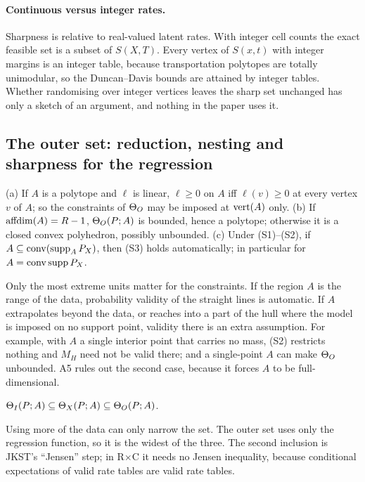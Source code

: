 \paragraph{Continuous versus integer rates.} Sharpness is relative to real-valued
latent rates. With integer cell counts the exact feasible set is a subset of
$S(X,T)$. Every vertex of $S(x,t)$ with integer margins is an integer table,
because transportation polytopes are totally unimodular, so the Duncan--Davis
bounds are attained by integer tables. Whether randomising over integer vertices
leaves the sharp set unchanged has only a sketch of an argument, and nothing in
the paper uses it.

\subsection{The outer set: reduction, nesting and sharpness for the regression}

\begin{lemma}\label{lem:outer}
(a) If $A$ is a polytope and $\ell$ is linear, $\ell\ge0$ on $A$ iff $\ell(v)\ge0$
at every vertex $v$ of $A$; so the constraints of $\Theta_O$ may be imposed at
$\operatorname{vert}(A)$ only. (b) If $\operatorname{affdim}(A)=R-1$, $\Theta_O(P;A)$ is bounded, hence a
polytope; otherwise it is a closed convex polyhedron, possibly unbounded.
(c) Under (S1)--(S2), if $A\subseteq\operatorname{conv}(\operatorname{supp}_AP_X)$, then (S3) holds
automatically; in particular for $A=\operatorname{conv}\operatorname{supp} P_X$.
\end{lemma}
\begin{reading}
Only the most extreme units matter for the constraints. If the region $A$ is the
range of the data, probability validity of the straight lines is automatic. If
$A$ extrapolates beyond the data, or reaches into a part of the hull where the
model is imposed on no support point, validity there is an extra assumption.
For example, with $A$ a single interior point that carries no mass, (S2)
restricts nothing and $M_H$ need not be valid there; and a single-point $A$ can
make $\Theta_O$ unbounded. A5 rules out the second case, because it forces $A$ to be
full-dimensional.
\end{reading}

\begin{proposition}[Nesting]\label{prop:nesting}
$\Theta_I(P;A)\subseteq\Theta_X(P;A)\subseteq\Theta_O(P;A)$.
\end{proposition}
\begin{reading}
Using more of the data can only narrow the set. The outer set uses only the
regression function, so it is the widest of the three. The second inclusion is
JKST's ``Jensen'' step; in R$\times$C it needs no Jensen inequality, because
conditional expectations of valid rate tables are valid rate tables.
\end{reading}

